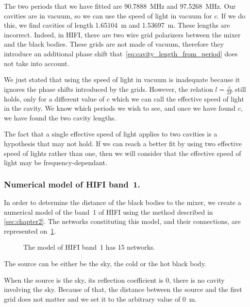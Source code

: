 The two periods that we have fitted are \SI{90.7888}{\mega\hertz} and \SI{97.5268}{\mega\hertz}.
Our cavities are in vacuum, so we can use the speed of light in vacuum for $c$.
If we do this, we find cavities of length \SI{1.65104}{\meter} and \SI{1.53697}{\meter}.
These lengths are incorrect.
Indeed, in HIFI, there are two wire grid polarizers between the mixer and the black bodies.
These grids are not made of vacuum, therefore they introduce an additional phase shift that~\cref{eq:cavity_length_from_period} does not take into account.

We just stated that using the speed of light in vacuum is inadequate because it ignores the phase shifts introduced by the grids.
However, the relation $l = \frac{c}{2F}$ still holds, only for a different value of $c$ which we can call the effective speed of light in the cavity.
We know which periods we wish to see, and once we have found $c$, we have found the two cavity lengths.

The fact that a single effective speed of light applies to two cavities is a hypothesis that may not hold.
If we can reach a better fit by using two effective speed of lights rather than one, then we will consider that the effective speed of light may be frequency-dependant.

\subsubsection{Numerical model of HIFI band~1.}
In order to determine the distance of the black bodies to the mixer, we create a numerical model of the band~1 of HIFI using the method described in \cref{sec:chapter2}.
The networks constituting this model, and their connections, are represented on~\cref{fig:networks_band_1}.

\begin{figure}
    \caption{The model of HIFI band~1 has 15 networks.}
    \label{fig:networks_band_1}
\end{figure}

The source can be either be the sky, the cold or the hot black body.

When the source is the sky, its reflection coefficient is 0, there is no cavity involving the sky.
Because of that, the distance between the source and the first grid does not matter and we set it to the arbitrary value of \SI{0}{\meter}.

